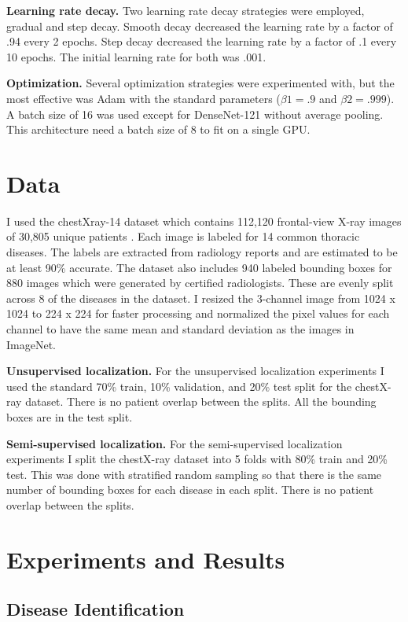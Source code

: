\documentclass{article}
\begin{document}
{\bf Learning rate decay.} Two learning rate decay strategies were employed, gradual and step decay. Smooth decay decreased the learning rate by a factor of .94 every 2 epochs. Step decay decreased the learning rate by a factor of .1 every 10 epochs. The initial learning rate for both was .001.

{\bf Optimization.} Several optimization strategies were experimented with, but the most effective was Adam with the standard parameters (${\beta}1=.9$ and ${\beta}2=.999$). A batch size of 16 was used except for DenseNet-121 without average pooling. This architecture need a batch size of 8 to fit on a single GPU.

\section{Data}
\label{Data}

I used the chestXray-14 dataset which contains 112,120 frontal-view X-ray images of 30,805 unique patients \cite{Wang}.
Each image is labeled for 14 common thoracic diseases. The labels are extracted from radiology
reports and are estimated to be at least 90\% accurate. The dataset also includes 940 labeled
bounding boxes for 880 images which were generated by certified radiologists.
These are evenly split across 8 of the diseases in the dataset.
I resized the 3-channel image from 1024 x 1024 to 224 x 224 for faster processing
and normalized the pixel values for each channel to have the same mean and standard deviation as the images in ImageNet.

{\bf Unsupervised localization.} For the unsupervised localization experiments
I used the standard 70\% train, 10\% validation, and 20\% test split for the chestX-ray dataset.
There is no patient overlap between the splits. All the bounding boxes are in the test split.

{\bf Semi-supervised localization.} For the semi-supervised localization experiments
I split the chestX-ray dataset into 5 folds with 80\% train and 20\% test.
This was done with stratified random sampling so that there is the same number of
bounding boxes for each disease in each split. There is no patient overlap between the splits.

\section{Experiments and Results}
\label{Experiments and Results}

\subsection{Disease Identification}
\end{document}
